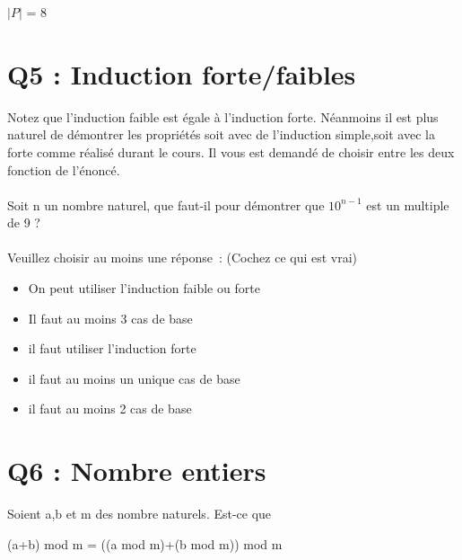   $|P|$ = 8 \\

\newpage
\section{Q5 : Induction forte/faibles}

\vspace{5mm} %

Notez que l’induction faible est égale à l’induction forte. Néanmoins il est plus naturel de démontrer les propriétés soit avec de l’induction simple,soit avec la forte comme réalisé durant le cours. Il vous est demandé de choisir entre les deux fonction de l’énoncé.\\ \\
Soit n un nombre naturel, que faut-il pour démontrer que $10^{n-1}$ est un multiple de 9 ? \\ \\
Veuillez choisir au moins une réponse : (Cochez ce qui est vrai)\\

\begin{itemize}[label=$\square$]
\item On peut utiliser l’induction faible ou forte
\item Il faut au moins 3 cas de base
\item il faut utiliser l’induction forte
\item il faut au moins un unique cas de base
\item il faut au moins 2 cas de base
\end{itemize}

\vspace{5mm} %

\section{Q6 : Nombre entiers}

\vspace{5mm} %


Soient a,b et m des nombre naturels. Est-ce que

\vspace{2mm} %

(a+b) mod m = ((a mod m)+(b mod m)) mod m \\

\vspace{4mm} %

